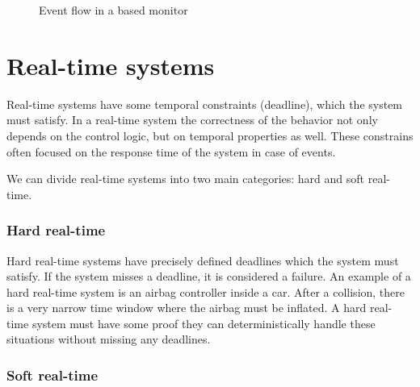 \begin{figure}
	\centering
	\caption{Event flow in a \cep{} based monitor}
\label{fig:cep_monitoring_event_flow}
\end{figure}

\section{Real-time systems}

Real-time systems have some temporal constraints (deadline), which the system must satisfy. In a real-time system the correctness of the behavior not only depends on the control logic, but on temporal properties as well. These constrains often focused on the response time of the system in case of events.

We can divide real-time systems into two main categories: hard and soft real-time.

\subsubsection{Hard real-time}

Hard real-time systems have precisely defined deadlines which the system must satisfy. If the system misses a deadline, it is considered a failure. An example of a hard real-time system is an airbag controller inside a car. After a collision, there is a very narrow time window where the airbag must be inflated. A hard real-time system must have some proof they can deterministically handle these situations without missing any deadlines.

\subsubsection{Soft real-time}

